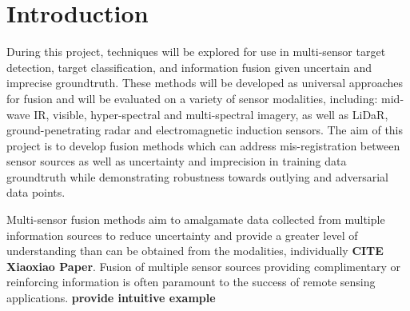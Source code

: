 \chapter{Introduction}

During this project, techniques will be explored for use in multi-sensor target detection, target classification, and information fusion given uncertain and imprecise groundtruth.  These methods will be developed as universal approaches for fusion and will be evaluated on a variety of sensor modalities, including: mid-wave IR, visible, hyper-spectral and multi-spectral imagery, as well as LiDaR, ground-penetrating radar and electromagnetic induction sensors.  The aim of this project is to develop fusion methods which can address mis-registration between sensor sources as well as uncertainty and imprecision in training data groundtruth while demonstrating robustness towards outlying and adversarial data points. \newline

Multi-sensor fusion methods aim to amalgamate data collected from multiple information sources to reduce uncertainty and provide a greater level of understanding than can be obtained from the modalities, individually \textbf{CITE Xiaoxiao Paper}.  Fusion of multiple sensor sources providing complimentary or reinforcing information is often paramount to the success of remote sensing applications.  \textbf{provide intuitive example} 

